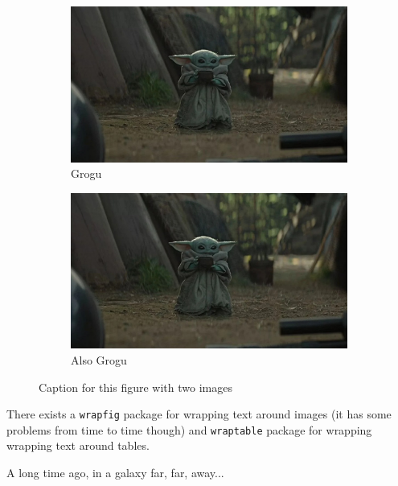 \documentclass[a4paper]{article}
\begin{document}
\begin{figure}[H]
\begin{subfigure}{0.5\textwidth}
\centering
\includegraphics[width=0.9\linewidth]{grogu}
\caption{Grogu}
\label{fig:grogu1}
\end{subfigure}
\begin{subfigure}{\textwidth-\leftmargin}
\centering
\includegraphics[width=0.9\linewidth,angle=-90]{grogu}
\caption{Also Grogu}
\label{fig:grogu2}
\end{subfigure}

\caption{Caption for this figure with two images}
\label{fig:grogu}
\end{figure}

There exists a \texttt{wrapfig} package for wrapping text around images (it has some problems from time to time though) and \texttt{wraptable} package for wrapping wrapping text around tables.
\vspace{1ex}

A long time ago, in a galaxy far, far, away...
\end{document}
